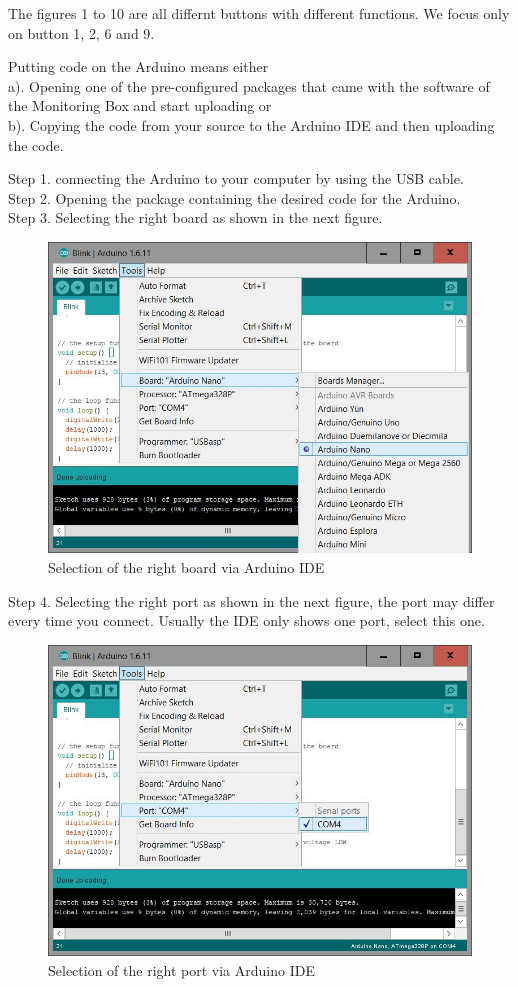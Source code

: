 \documentclass{report}
\begin{document}
The figures 1 to 10 are all differnt buttons with different functions. We focus only on button 1, 2,  6 and 9.

Putting code on the Arduino means either \\
a). Opening one of the pre-configured packages that came with the software of the Monitoring Box and start uploading or \\
b). Copying the code from your source to the Arduino IDE and then uploading the code. \newpage

Step 1. connecting the Arduino to your computer by using the USB cable. \\
Step 2. Opening the package containing the desired code for the Arduino. \\
Step 3. Selecting the right board as shown in the next figure. \\
\begin{figure}[H]
	\centering
\includegraphics[width=1\textwidth]{images/Select-board.JPG} 
	\caption{Selection of the right board via Arduino IDE}
\end{figure}
Step 4. Selecting the right port as shown in the next figure, the port may differ every time you connect. Usually the IDE only shows one port, select this one. \\
\begin{figure}[H]
	\centering
\includegraphics[width=1\textwidth]{images/Select-port.JPG} 
	\caption{Selection of the right port via Arduino IDE}
\end{figure}
\end{document}
